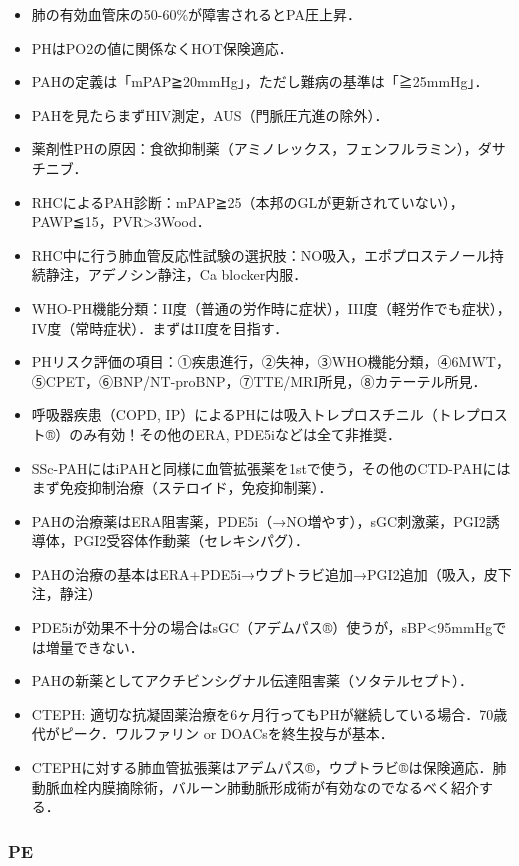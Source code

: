 \begin{itemize}
\item 肺の有効血管床の50-60\%が障害されるとPA圧上昇．
\item PHはPO2の値に関係なくHOT保険適応．
\item PAHの定義は「mPAP≧20mmHg」，ただし難病の基準は「≧25mmHg」．
\item PAHを見たらまずHIV測定，AUS（門脈圧亢進の除外）．
\item 薬剤性PHの原因：食欲抑制薬（アミノレックス，フェンフルラミン），ダサチニブ．
\item RHCによるPAH診断：mPAP≧25（本邦のGLが更新されていない），PAWP≦15，PVR>3Wood．
\item RHC中に行う肺血管反応性試験の選択肢：NO吸入，エポプロステノール持続静注，アデノシン静注，Ca blocker内服．
\item WHO-PH機能分類：II度（普通の労作時に症状），III度（軽労作でも症状），IV度（常時症状）．まずはII度を目指す．
\item PHリスク評価の項目：①疾患進行，②失神，③WHO機能分類，④6MWT，⑤CPET，⑥BNP/NT-proBNP，⑦TTE/MRI所見，⑧カテーテル所見．


\item 呼吸器疾患（COPD, IP）によるPHには吸入トレプロスチニル（トレプロスト®）のみ有効！その他のERA, PDE5iなどは全て非推奨．
\item SSc-PAHにはiPAHと同様に血管拡張薬を1stで使う，その他のCTD-PAHにはまず免疫抑制治療（ステロイド，免疫抑制薬）．
\item PAHの治療薬はERA阻害薬，PDE5i（→NO増やす），sGC刺激薬，PGI2誘導体，PGI2受容体作動薬（セレキシパグ）．
\item PAHの治療の基本はERA+PDE5i→ウプトラビ追加→PGI2追加（吸入，皮下注，静注）
\item PDE5iが効果不十分の場合はsGC（アデムパス®）使うが，sBP<95mmHgでは増量できない．
\item PAHの新薬としてアクチビンシグナル伝達阻害薬（ソタテルセプト）．
\item CTEPH: 適切な抗凝固薬治療を6ヶ月行ってもPHが継続している場合．70歳代がピーク．ワルファリン or DOACsを終生投与が基本．
\item CTEPHに対する肺血管拡張薬はアデムパス®，ウプトラビ®は保険適応．肺動脈血栓内膜摘除術，バルーン肺動脈形成術が有効なのでなるべく紹介する．
\end{itemize}


\subsubsection{PE}

